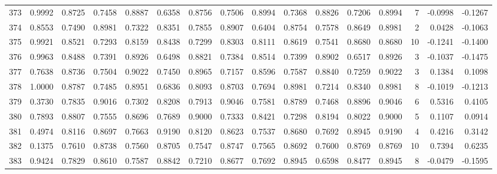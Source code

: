 \begin{tabular}{lrrrrrrrrrrrrrrr}
373 &      0.9992 &  0.8725 &  0.7458 &  0.8887 &  0.6358 &  0.8756 &  0.7506 &  0.8994 &  0.7368 &  0.8826 &   0.7206 &     0.8994 &      7 &                   -0.0998 &                    -0.1267 \\
374 &      0.8553 &  0.7490 &  0.8981 &  0.7322 &  0.8351 &  0.7855 &  0.8907 &  0.6404 &  0.8754 &  0.7578 &   0.8649 &     0.8981 &      2 &                    0.0428 &                    -0.1063 \\
375 &      0.9921 &  0.8521 &  0.7293 &  0.8159 &  0.8438 &  0.7299 &  0.8303 &  0.8111 &  0.8619 &  0.7541 &   0.8680 &     0.8680 &     10 &                   -0.1241 &                    -0.1400 \\
376 &      0.9963 &  0.8488 &  0.7391 &  0.8926 &  0.6498 &  0.8821 &  0.7384 &  0.8514 &  0.7399 &  0.8902 &   0.6517 &     0.8926 &      3 &                   -0.1037 &                    -0.1475 \\
377 &      0.7638 &  0.8736 &  0.7504 &  0.9022 &  0.7450 &  0.8965 &  0.7157 &  0.8596 &  0.7587 &  0.8840 &   0.7259 &     0.9022 &      3 &                    0.1384 &                     0.1098 \\
378 &      1.0000 &  0.8787 &  0.7485 &  0.8951 &  0.6836 &  0.8093 &  0.8703 &  0.7694 &  0.8981 &  0.7214 &   0.8340 &     0.8981 &      8 &                   -0.1019 &                    -0.1213 \\
379 &      0.3730 &  0.7835 &  0.9016 &  0.7302 &  0.8208 &  0.7913 &  0.9046 &  0.7581 &  0.8789 &  0.7468 &   0.8896 &     0.9046 &      6 &                    0.5316 &                     0.4105 \\
380 &      0.7893 &  0.8807 &  0.7555 &  0.8696 &  0.7689 &  0.9000 &  0.7333 &  0.8421 &  0.7298 &  0.8194 &   0.8022 &     0.9000 &      5 &                    0.1107 &                     0.0914 \\
381 &      0.4974 &  0.8116 &  0.8697 &  0.7663 &  0.9190 &  0.8120 &  0.8623 &  0.7537 &  0.8680 &  0.7692 &   0.8945 &     0.9190 &      4 &                    0.4216 &                     0.3142 \\
382 &      0.1375 &  0.7610 &  0.8738 &  0.7560 &  0.8705 &  0.7547 &  0.8747 &  0.7565 &  0.8692 &  0.7600 &   0.8769 &     0.8769 &     10 &                    0.7394 &                     0.6235 \\
383 &      0.9424 &  0.7829 &  0.8610 &  0.7587 &  0.8842 &  0.7210 &  0.8677 &  0.7692 &  0.8945 &  0.6598 &   0.8477 &     0.8945 &      8 &                   -0.0479 &                    -0.1595 \\

\end{tabular}
